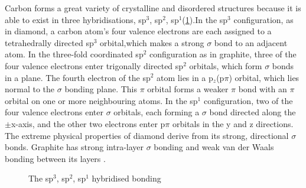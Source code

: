 		Carbon forms a great variety of crystalline and disordered structures because it is able to exist in three hybridisations, sp$^3$, sp$^2$, sp$^1$(\cref{fig::c_bonds})\cite{Robertson1986}.In the sp$^3$ configuration, as in diamond, a carbon atom's four valence electrons are each assigned to a tetrahedrally directed sp$^3$ orbital,which makes a strong $\sigma$ bond to an adjacent atom. In the three-fold coordinated sp$^2$ configuration as in graphite, three of the four valence electrons enter trigonally directed sp$^2$ orbitals, which form $\sigma$ bonds in a plane. The fourth electron of the sp$^2$ atom lies in a p$_z$(p$\pi$) orbital, which lies normal to the $\sigma$ bonding plane. This $\pi$  orbital forms a weaker $\pi$ bond with an $\pi$ orbital on one or more neighbouring atoms. In the sp$^1$ configuration, two of the four valence electrons enter $\sigma$ orbitals, each forming a $\sigma$ bond directed along the $\pm$x-axis, and the other two electrons enter p$\pi$ orbitals in the y and z directions. The extreme physical properties of diamond derive from its strong, directional $\sigma$ bonds. Graphite has strong intra-layer $\sigma$ bonding and weak van der Waals bonding between its layers \cite{Robertson2002}.

		\begin{figure}[htb]
			\centering
			\caption{The sp$^3$, sp$^2$, sp$^1$ hybridised bonding \cite{Robertson1986}}
			\label{fig::c_bonds}
		\end{figure}

